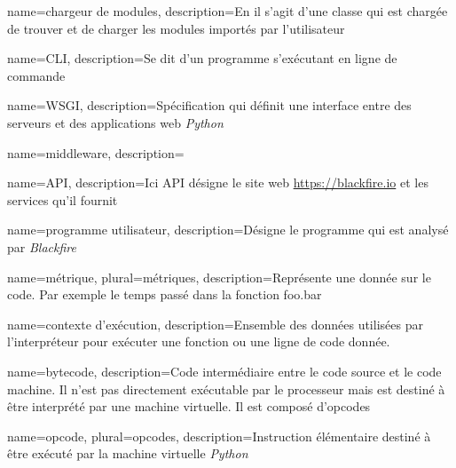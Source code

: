 {
  name=chargeur de modules,
  description={En \Python il s'agit d'une classe qui est chargée de trouver et de charger les modules importés par l'utilisateur}
}

{
  name=CLI,
  description=Se dit d'un programme s'exécutant en ligne de commande
}

{
  name=WSGI,
  description=Spécification qui définit une interface entre des serveurs et des applications web \emph{Python}
}

{
  name=middleware,
  description=%
}

{
  name=API,
  description=Ici API désigne le site web \url{https://blackfire.io} et les services qu'il fournit
}

{
  name=programme utilisateur,
  description=Désigne le programme qui est analysé par \emph{Blackfire}
}

{
  name=métrique,
  plural=métriques,
  description=Représente une donnée sur le code. Par exemple le temps passé dans la fonction foo.bar
}
 
{
  name=contexte d'exécution,
  description=Ensemble des données utilisées par l'interpréteur \Python pour exécuter une fonction ou une ligne de code donnée.
}
 
{
  name=bytecode,
  description=Code intermédiaire entre le code source et le code machine. Il n'est pas directement exécutable par le processeur mais est destiné à être interprété par une machine virtuelle. Il est composé d'opcodes
}
 
{
  name=opcode,
  plural=opcodes,
  description=Instruction élémentaire destiné à être exécuté par la machine virtuelle \emph{Python}
}
